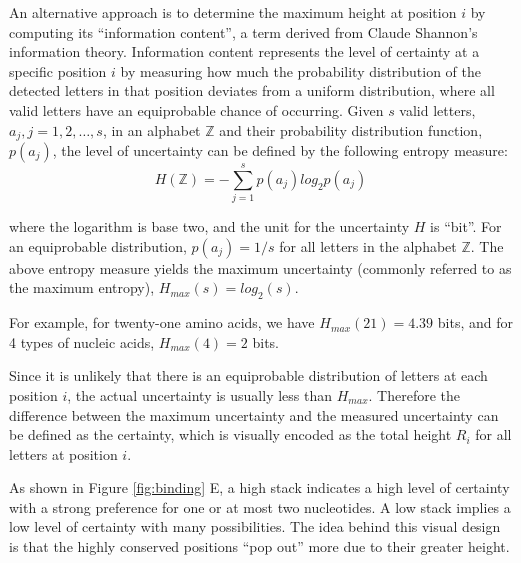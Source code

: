 An alternative approach is to determine the maximum height at position $i$ by computing its ``information content'', a term derived from Claude Shannon's information theory\cite{Shannon1948}.
Information content represents the level of certainty at a specific position $i$ by measuring how much the probability distribution of the detected letters in that position deviates from a uniform distribution, where all valid letters have an equiprobable chance of occurring.
Given $s$ valid letters, $a_j, j=1, 2, \ldots, s$, in an alphabet $\mathbb{Z}$ and their probability distribution function, $p(a_j)$, the level of uncertainty can be defined by the following entropy measure:
\[
H(\mathbb{Z}) = -\sum_{j=1}^s p(a_j) log_2 p(a_j)
\]

\noindent where the logarithm is base two, and the unit for the uncertainty $H$ is ``bit''.
For an equiprobable distribution, $p(a_j) = 1/s$ for all letters in the alphabet $\mathbb{Z}$.
The above entropy measure yields the maximum uncertainty (commonly referred to as the maximum entropy), $H_{max}(s) = log_2 (s)$.

\noindent For example, for twenty-one amino acids, we have $H_{max}(21) = 4.39$ bits, and for 4 types of nucleic acids, $H_{max}(4) = 2$ bits.

Since it is unlikely that there is an equiprobable distribution of letters at each position $i$, the actual uncertainty is usually less than $H_{max}$.
Therefore the difference between the maximum uncertainty and the measured uncertainty can be defined as the certainty, which is visually encoded as the total height $R_i$ for all letters at position $i$.

As shown in Figure \ref{fig:binding} E, a high stack indicates a high level of certainty with a strong preference for one or at most two nucleotides.
A low stack implies a low level of certainty with many possibilities.
The idea behind this visual design is that the highly conserved positions ``pop out'' more due to their greater height.

%

